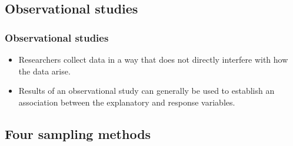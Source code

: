 \documentclass[slidestop,compress,mathserif]{beamer}
\begin{document}



\subsection{Observational studies}


\begin{frame}
	\frametitle{Observational studies}

	\begin{itemize}
		\item Researchers collect data in a way that does not directly interfere with how the data arise.
		\item Results of an observational study can generally be used to establish an association between the explanatory and response variables.
	\end{itemize}

\end{frame}


\subsection{Four sampling methods}
\end{document}
